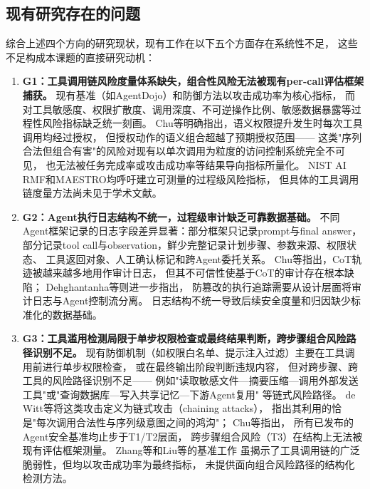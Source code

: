 \subsection{现有研究存在的问题}

综合上述四个方向的研究现状，现有工作在以下五个方面存在系统性不足，
这些不足构成本课题的直接研究动机：

\begin{enumerate}
  \item \textbf{G1：工具调用链风险度量体系缺失，组合性风险无法被现有per-call评估框架捕获。}
  现有基准（如AgentDojo\cite{balunovic2024agentdojo}）和防御方法以攻击成功率为核心指标，
  而对工具敏感度、权限扩散度、调用深度、不可逆操作比例、敏感数据暴露等过程性风险指标缺乏统一刻画。
  Chu等\cite{chu2026systematic}明确指出，语义权限提升发生时每次工具调用均经过授权，
  但授权动作的语义组合超越了预期授权范围——
  这类"序列合法但组合有害"的风险对现有以单次调用为粒度的访问控制系统完全不可见，
  也无法被任务完成率或攻击成功率等结果导向指标所量化。
  NIST AI RMF\cite{nist2023airmf}和MAESTRO\cite{huang2025maestro}均呼吁建立可测量的过程级风险指标，
  但具体的工具调用链度量方法尚未见于学术文献。

  \item \textbf{G2：Agent执行日志结构不统一，过程级审计缺乏可靠数据基础。}
  不同Agent框架记录的日志字段差异显著：部分框架只记录prompt与final answer，
  部分记录tool call与observation，鲜少完整记录计划步骤、参数来源、权限状态、
  工具返回对象、人工确认标记和跨Agent委托关系。
  Chu等\cite{chu2026systematic}指出，CoT轨迹被越来越多地用作审计日志，
  但其不可信性使基于CoT的审计存在根本缺陷；
  Dehghantanha等\cite{dehghantanha2026sokattacksurfaceagentic}则进一步指出，
  防篡改的执行追踪需要从设计层面将审计日志与Agent控制流分离。
  日志结构不统一导致后续安全度量和归因缺少标准化的数据基础。

  \item \textbf{G3：工具滥用检测局限于单步权限检查或最终结果判断，跨步骤组合风险路径识别不足。}
  现有防御机制（如权限白名单、提示注入过滤）主要在工具调用前进行单步权限检查，
  或在最终输出阶段判断违规内容，
  但对跨步骤、跨工具的风险路径识别不足——
  例如"读取敏感文件—摘要压缩—调用外部发送工具"或"查询数据库—写入共享记忆—下游Agent复用"
  等链式风险路径。
  de Witt等\cite{dewitt2026openchallenges}将这类攻击定义为链式攻击（chaining attacks），
  指出其利用的恰是"每次调用合法性与序列级意图之间的鸿沟"；
  Chu等\cite{chu2026systematic}指出，
  所有已发布的Agent安全基准均止步于T1/T2层面，
  跨步骤组合风险（T3）在结构上无法被现有评估框架测量。
  Zhang等\cite{zhang2024injectagent}和Liu等\cite{liu2024formalizing}的基准工作
  虽揭示了工具调用链的广泛脆弱性，但均以攻击成功率为最终指标，
  未提供面向组合风险路径的结构化检测方法。


\end{enumerate}
